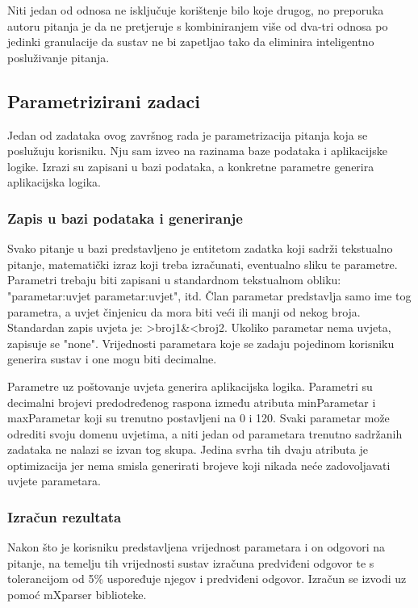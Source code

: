 \documentclass[times, utf8, zavrsni, numeric]{fer}
\begin{document}
Niti jedan od odnosa ne isključuje korištenje bilo koje drugog, no preporuka autoru pitanja je da ne pretjeruje s kombiniranjem više od dva-tri odnosa po jedinki granulacije da sustav ne bi zapetljao tako da eliminira inteligentno posluživanje pitanja.

\subsection{Parametrizirani zadaci}
Jedan od zadataka ovog završnog rada je parametrizacija pitanja koja se poslužuju korisniku. Nju sam izveo na razinama baze podataka i aplikacijske logike. Izrazi su zapisani u bazi podataka, a konkretne parametre generira aplikacijska logika.

\subsubsection{Zapis u bazi podataka i generiranje}
Svako pitanje u bazi predstavljeno je entitetom zadatka koji sadrži tekstualno pitanje, matematički izraz koji treba izračunati, eventualno sliku te parametre. Parametri trebaju biti zapisani u standardnom tekstualnom obliku: "parametar:uvjet parametar:uvjet", itd. Član parametar predstavlja samo ime tog parametra, a uvjet činjenicu da mora biti veći ili manji od nekog broja. Standardan zapis uvjeta je: >broj1\&<broj2. Ukoliko parametar nema uvjeta, zapisuje se "none". Vrijednosti parametara koje se zadaju pojedinom korisniku generira sustav i one mogu biti decimalne.
\par
Parametre uz poštovanje uvjeta generira aplikacijska logika. Parametri su decimalni brojevi predodređenog raspona između atributa minParametar i maxParametar koji su trenutno postavljeni na 0 i 120. Svaki parametar može odrediti svoju domenu uvjetima, a niti jedan od parametara trenutno sadržanih zadataka ne nalazi se izvan tog skupa. Jedina svrha tih dvaju atributa je optimizacija jer nema smisla generirati brojeve koji nikada neće zadovoljavati uvjete parametara.

\subsubsection{Izračun rezultata}
Nakon što je korisniku predstavljena vrijednost parametara i on odgovori na pitanje, na temelju tih vrijednosti sustav izračuna predviđeni odgovor te s tolerancijom od 5\% uspoređuje njegov i predviđeni odgovor. Izračun se izvodi uz pomoć mXparser biblioteke.
\end{document}
